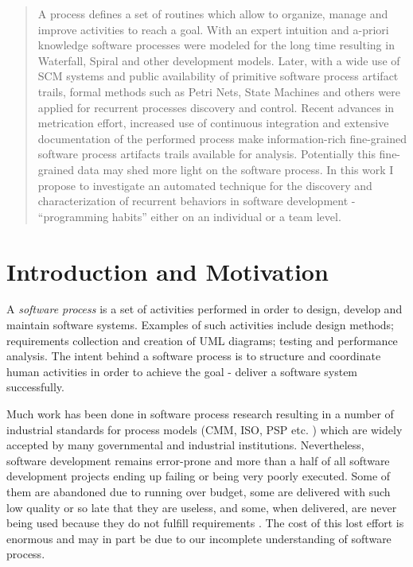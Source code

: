\documentclass{sig-alternate}
\begin{document}
\begin{abstract}
A process defines a set of routines which allow to organize, manage and improve activities to reach a goal. With an expert intuition and a-priori knowledge software processes were modeled for the long time resulting in Waterfall, Spiral and other development models. Later, with a wide use of SCM systems and public availability of primitive software process artifact trails, formal methods such as Petri Nets, State Machines and others were applied for recurrent processes discovery and control. Recent advances in metrication effort, increased use of continuous integration and extensive documentation of the performed process make information-rich fine-grained software process artifacts trails available for analysis. Potentially this fine-grained data may shed more light on the software process. In this work I propose to investigate an automated technique for the discovery and characterization of recurrent behaviors in software development - ``programming habits'' either on an individual or a team level.
\end{abstract}




\section{Introduction and Motivation}
A \textit{software process} is a set of activities performed in order to design, develop and maintain software systems. Examples of such activities include design methods; requirements collection and creation of UML diagrams; testing and performance analysis. The intent behind a software process is to structure and coordinate human activities in order to achieve the goal - deliver a software system successfully. 

Much work has been done in software process research resulting in a number of industrial standards for process models (CMM, ISO, PSP etc. \cite{citeulike:5043104}) which are widely accepted by many governmental and industrial institutions. Nevertheless, software development remains error-prone and more than a half of all software development projects ending up failing or being very poorly executed. Some of them are abandoned due to running over budget, some are delivered with such low quality or so late that they are useless, and some, when delivered, are never being used because they do not fulfill requirements \cite{citeulike:7351135}. The cost of this lost effort is enormous and may in part be due to our incomplete understanding of software process.
\end{document}
